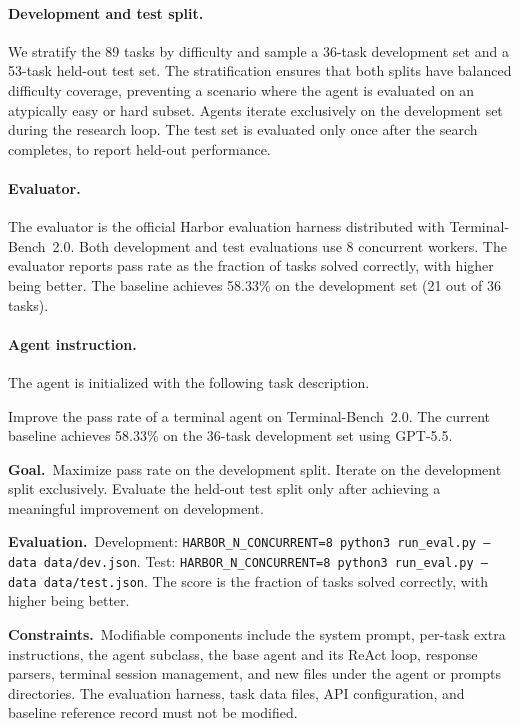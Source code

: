\documentclass{llmxive}
\begin{document}
\paragraph{Development and test split.}
We stratify the 89 tasks by difficulty and sample a 36-task development
set and a 53-task held-out test set.
The stratification ensures that both splits have balanced difficulty
coverage, preventing a scenario where the agent is evaluated on an
atypically easy or hard subset.
Agents iterate exclusively on the development set during the research
loop.
The test set is evaluated only once after the search completes, to
report held-out performance.

\paragraph{Evaluator.}
The evaluator is the official Harbor evaluation harness distributed with
Terminal-Bench~2.0.
Both development and test evaluations use 8 concurrent workers.
The evaluator reports pass rate as the fraction of tasks solved correctly,
with higher being better.
The baseline achieves 58.33\% on the development set (21 out of 36 tasks).

\paragraph{Agent instruction.}
The agent is initialized with the following task description.

\begin{promptbox}[title=\textbf{Terminal-Bench 2.0 Task Instruction}]
Improve the pass rate of a terminal agent on Terminal-Bench~2.0.
The current baseline achieves 58.33\% on the 36-task development set
using GPT-5.5.

\smallskip
\noindent\textbf{Goal.}~Maximize pass rate on the development split.
Iterate on the development split exclusively.
Evaluate the held-out test split only after achieving a meaningful
improvement on development.

\smallskip
\noindent\textbf{Evaluation.}~Development: \texttt{HARBOR\_N\_CONCURRENT=8 python3 run\_eval.py --data data/dev.json}.
Test: \texttt{HARBOR\_N\_CONCURRENT=8 python3 run\_eval.py --data data/test.json}.
The score is the fraction of tasks solved correctly, with higher being better.

\smallskip
\noindent\textbf{Constraints.}~Modifiable components include the system
prompt, per-task extra instructions, the agent subclass, the base agent
and its ReAct loop, response parsers, terminal session management, and
new files under the agent or prompts directories.
The evaluation harness, task data files, API configuration, and baseline
reference record must not be modified.
\end{promptbox}
\end{document}
